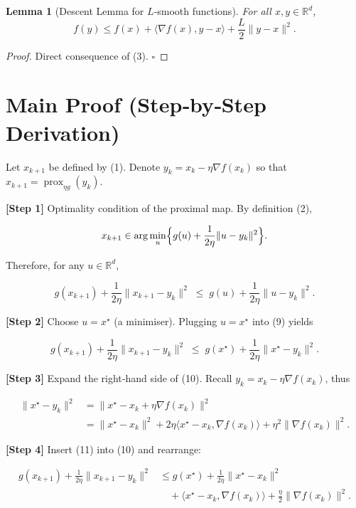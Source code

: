 \documentclass{article}
\newtheorem{lemma}{Lemma}
\newcommand{\prox}{\operatorname{prox}}
\newcommand{\R}{\mathbb{R}}
\begin{document}
\begin{lemma}[Descent Lemma for $L$‑smooth functions]\label{lem:descent}
For all $x,y\in\R^{d}$,
\[
f(y)\le f(x)+\langle\nabla f(x),y-x\rangle+\frac{L}{2}\|y-x\|^{2}.
\tag{8}
\]
\end{lemma}
\begin{proof}
Direct consequence of (3). \(\square\)
\end{proof}

\section*{Main Proof (Step‑by‑Step Derivation)}

Let $x_{k+1}$ be defined by (1). Denote $y_{k}=x_{k}-\eta\nabla f(x_{k})$ so that $x_{k+1}=\prox_{\eta g}(y_{k})$.

\noindent\textbf{[Step 1]} Optimality condition of the proximal map.  
By definition (2),

\[
x_{k+1}\in\arg\min_{u}\Bigl\{ g(u)+\frac{1}{2\eta}\|u-y_{k}\|^{2}\Bigr\}.
\]

Therefore, for any $u\in\R^{d}$,

\[
g(x_{k+1})+\frac{1}{2\eta}\|x_{k+1}-y_{k}\|^{2}
\;\le\;
g(u)+\frac{1}{2\eta}\|u-y_{k}\|^{2}.
\tag{9}
\]

\noindent\textbf{[Step 2]} Choose $u=x^{\star}$ (a minimiser). Plugging $u=x^{\star}$ into (9) yields

\[
g(x_{k+1})+\frac{1}{2\eta}\|x_{k+1}-y_{k}\|^{2}
\;\le\;
g(x^{\star})+\frac{1}{2\eta}\|x^{\star}-y_{k}\|^{2}.
\tag{10}
\]

\noindent\textbf{[Step 3]} Expand the right‑hand side of (10).  
Recall $y_{k}=x_{k}-\eta\nabla f(x_{k})$, thus

\[
\begin{aligned}
\|x^{\star}-y_{k}\|^{2}
&=\|x^{\star}-x_{k}+\eta\nabla f(x_{k})\|^{2}\\
&=\|x^{\star}-x_{k}\|^{2}+2\eta\langle x^{\star}-x_{k},\nabla f(x_{k})\rangle+\eta^{2}\|\nabla f(x_{k})\|^{2}.
\end{aligned}
\tag{11}
\]

\noindent\textbf{[Step 4]} Insert (11) into (10) and rearrange:

\[
\begin{aligned}
g(x_{k+1})+ \frac{1}{2\eta}\|x_{k+1}-y_{k}\|^{2}
&\le g(x^{\star})+\frac{1}{2\eta}\|x^{\star}-x_{k}\|^{2}\\
&\quad+ \langle x^{\star}-x_{k},\nabla f(x_{k})\rangle
+\frac{\eta}{2}\|\nabla f(x_{k})\|^{2}.
\end{aligned}
\tag{12}
\]
\end{document}
